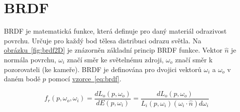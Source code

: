 \documentclass[czech,master]{diploma}
\newcommand{\uvec}[1]{\hat{#1}}
\newcommand{\point}{p}
\newcommand{\brdf}{f_r\left(\point,\omega_{o},\omega_{i}\right)}
\newcommand{\normVec}{\uvec{n}}
\newcommand{\inVec}{\omega_{i}}
\newcommand{\outVec}{\omega_{o}}
\newcommand{\outRadiance}{L_o\left(\point,\outVec\right)}
\newcommand{\inRadiance}{L_i\left(\point,\inVec\right)}
\newcommand{\irradiance}{E\left(\point,\inVec\right)}
\newcommand{\inDotNorm}{\left(\inVec\cdot\normVec\right)}
\begin{document}
\clearpage
\chapter{BRDF}
BRDF je matematická funkce, která definuje pro daný materiál odrazivost povrchu. Určuje pro každý bod tělesa distribuci odrazu světla. Na \hyperref[fig:brdf2D]{obrázku~\ref{fig:brdf2D}} je znázorněn základní princip BRDF funkce. Vektor \(\normVec\) je normála povrchu, \(\inVec\) značí směr ke světelnému zdroji, \(\outVec\) značí směr k pozorovateli (ke kameře). BRDF je definována pro dvojici vektorů  \(\inVec\) a \(\outVec\) v daném bodě \(p\) pomocí \hyperref[eq:brdf]{vzorce~\ref{eq:brdf}}.

\begin{equation} \label{eq:brdf}
  \brdf = \frac{d\outRadiance}{d\irradiance} = \frac{d\outRadiance}{\inRadiance \inDotNorm d\inVec}
\end{equation}
\end{document}
